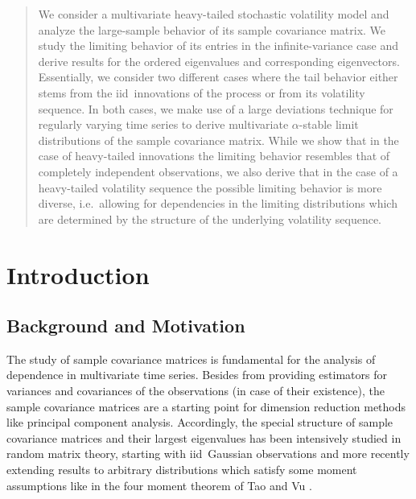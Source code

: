 \begin{abstract}
We consider a multivariate heavy-tailed stochastic volatility model
and analyze the large-sample behavior of its sample covariance
matrix. We study the limiting behavior of its entries in the
infinite-variance case and derive results for the ordered eigenvalues
and corresponding eigenvectors. Essentially, we consider two different
cases where the tail behavior either stems from the iid\ innovations
of the process or from its volatility sequence. In both cases, we make
use of a large deviations technique for regularly varying time series
to derive multivariate $\alpha$-stable limit distributions of the
sample covariance matrix. While we show that in the case of
heavy-tailed innovations the limiting behavior resembles that of
completely independent observations, we also derive that in the case
of a heavy-tailed volatility sequence the possible limiting behavior
is more diverse, i.e.\ allowing for dependencies in the limiting
distributions which are determined by the structure of the underlying
volatility sequence.
\end{abstract}



\section{Introduction}\label{sec:intro}
\subsection{Background and Motivation}\label{subsec:motivation}

The study of sample covariance matrices is fundamental for the
analysis of dependence in multivariate time series. Besides from
providing estimators for variances and covariances of the observations
(in case of their existence), the sample covariance matrices are a
starting point for dimension reduction methods like principal
component analysis. Accordingly, the special structure of sample
covariance matrices and their largest eigenvalues has been intensively
studied in random matrix theory, starting with iid\ Gaussian
observations and more recently extending results to arbitrary
distributions which satisfy some moment assumptions like in the four
moment theorem of Tao and Vu \cite{tao:vu:2012}.

